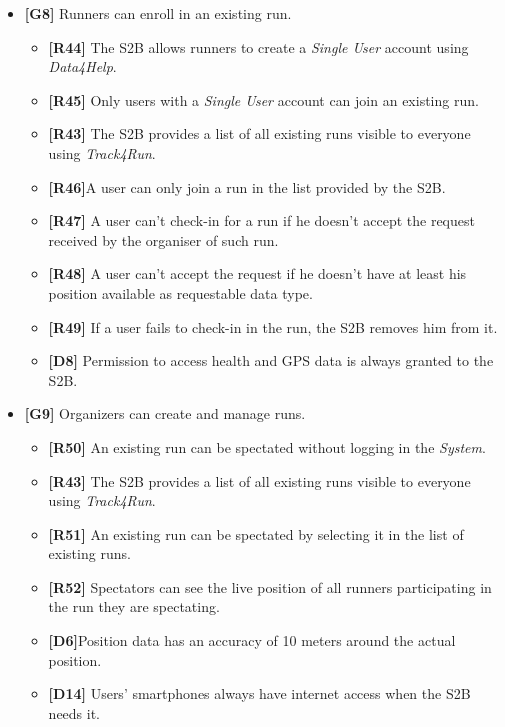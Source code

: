 \documentclass[titlepage]{article}
\begin{document}
\begin{itemize}
\begin{itemize}
					\end{itemize}
					
					\item {\bf [G8]}  Runners can enroll in an existing run.
				 
					 \begin{itemize} %
					 	\item {\bf [R44]} The S2B allows runners to create a {\it Single User} account using {\it Data4Help}.
\item {\bf [R45]} Only users with a {\it Single User} account can join an existing run.
\item {\bf [R43]} The S2B provides a list of all existing runs visible to everyone using {\it Track4Run}.
\item {\bf [R46]}A user can only join a run in the list provided by the S2B.
\item {\bf [R47]} A user can’t check-in for a run if he doesn’t accept the request received by the organiser of such run.
\item {\bf [R48]} A user can’t accept the request if he doesn’t have at least his position available as requestable data type.
\item {\bf [R49]} If a user fails to check-in in the run, the S2B removes him from it.
\item {\bf [D8]} Permission to access health and GPS data is always granted to the S2B.

					\end{itemize}
					
					\item {\bf [G9]}  Organizers can create and manage runs.
				 
					 \begin{itemize} %
					 	\item {\bf [R50]} An existing run can be spectated without logging in the {\it System}.
\item {\bf [R43]} The S2B provides a list of all existing runs visible to everyone using {\it Track4Run}.
\item {\bf [R51]} An existing run can be spectated by selecting it in the list of existing runs.
\item {\bf [R52]} Spectators can see the live position of all runners participating in the run they are spectating.
\item {\bf [D6]}Position data has an accuracy of 10 meters around the actual position.
\item {\bf [D14]} Users’ smartphones always have internet access when the S2B needs it.
					\end{itemize}
				 
			\end{itemize}
			
\end{document}
